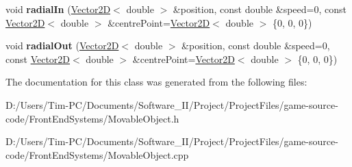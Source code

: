 \begin{DoxyCompactItemize}
\item 
\mbox{\label{class_movable_object_a96d7fef6420a2cbd96a55898fc61d476}} 
void {\bfseries radial\+In} (\hyperlink{class_vector2_d}{Vector2D}$<$ double $>$ \&position, const double \&speed=0, const \hyperlink{class_vector2_d}{Vector2D}$<$ double $>$ \&centre\+Point=\hyperlink{class_vector2_d}{Vector2D}$<$ double $>$ \{0, 0, 0\})
\item 
\mbox{\label{class_movable_object_aa0dd37ccd33ed6ef2f6f938f3aa9a9fc}} 
void {\bfseries radial\+Out} (\hyperlink{class_vector2_d}{Vector2D}$<$ double $>$ \&position, const double \&speed=0, const \hyperlink{class_vector2_d}{Vector2D}$<$ double $>$ \&centre\+Point=\hyperlink{class_vector2_d}{Vector2D}$<$ double $>$ \{0, 0, 0\})
\end{DoxyCompactItemize}


The documentation for this class was generated from the following files\+:\begin{DoxyCompactItemize}
\item 
D\+:/\+Users/\+Tim-\/\+P\+C/\+Documents/\+Software\+\_\+\+I\+I/\+Project/\+Project\+Files/game-\/source-\/code/\+Front\+End\+Systems/Movable\+Object.\+h\item 
D\+:/\+Users/\+Tim-\/\+P\+C/\+Documents/\+Software\+\_\+\+I\+I/\+Project/\+Project\+Files/game-\/source-\/code/\+Front\+End\+Systems/Movable\+Object.\+cpp\end{DoxyCompactItemize}
